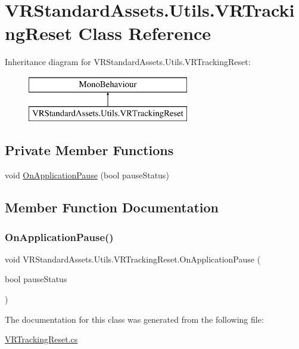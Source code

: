 \hypertarget{class_v_r_standard_assets_1_1_utils_1_1_v_r_tracking_reset}{}\section{V\+R\+Standard\+Assets.\+Utils.\+V\+R\+Tracking\+Reset Class Reference}
\label{class_v_r_standard_assets_1_1_utils_1_1_v_r_tracking_reset}
Inheritance diagram for V\+R\+Standard\+Assets.\+Utils.\+V\+R\+Tracking\+Reset\+:\begin{figure}[H]
\begin{center}
\leavevmode
\includegraphics[height=2.000000cm]{class_v_r_standard_assets_1_1_utils_1_1_v_r_tracking_reset}
\end{center}
\end{figure}
\subsection*{Private Member Functions}
\begin{DoxyCompactItemize}
\item 
void \mbox{\hyperlink{class_v_r_standard_assets_1_1_utils_1_1_v_r_tracking_reset_ac44c9cb15949558a8a3fa93bbb7c7e83}{On\+Application\+Pause}} (bool pause\+Status)
\end{DoxyCompactItemize}


\subsection{Member Function Documentation}
\mbox{\label{class_v_r_standard_assets_1_1_utils_1_1_v_r_tracking_reset_ac44c9cb15949558a8a3fa93bbb7c7e83}} 
\subsubsection{\texorpdfstring{On\+Application\+Pause()}{OnApplicationPause()}}
{\footnotesize\ttfamily void V\+R\+Standard\+Assets.\+Utils.\+V\+R\+Tracking\+Reset.\+On\+Application\+Pause (\begin{DoxyParamCaption}\item[{bool}]{pause\+Status }\end{DoxyParamCaption})\hspace{0.3cm}{\ttfamily [private]}}



The documentation for this class was generated from the following file\+:\begin{DoxyCompactItemize}
\item 
\mbox{\hyperlink{_v_r_tracking_reset_8cs}{V\+R\+Tracking\+Reset.\+cs}}\end{DoxyCompactItemize}
